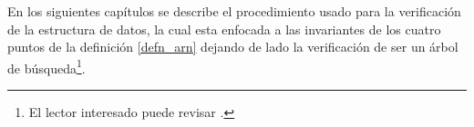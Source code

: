 En los siguientes capítulos se describe el procedimiento usado para la verificaci\'on de la
estructura de datos, la cual esta enfocada a las invariantes de los cuatro puntos de la definici\'on \ref{defn_arn} dejando de lado la verificaci\'on de ser un \'arbol de b\'usqueda\footnote{El lector interesado puede revisar \cite{appel}.}.
